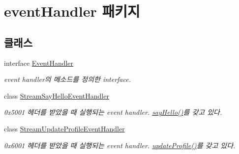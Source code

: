 \hypertarget{namespaceevent_handler}{\section{event\+Handler 패키지}
\label{namespaceevent_handler}
}
\subsection*{클래스}
\begin{DoxyCompactItemize}
\item 
interface \hyperlink{interfaceevent_handler_1_1_event_handler}{Event\+Handler}
\begin{DoxyCompactList}\small\item\em event handler의 메소드를 정의한 interface. \end{DoxyCompactList}\item 
class \hyperlink{classevent_handler_1_1_stream_say_hello_event_handler}{Stream\+Say\+Hello\+Event\+Handler}
\begin{DoxyCompactList}\small\item\em 0x5001 헤더를 받았을 때 실행되는 event handler. \hyperlink{classevent_handler_1_1_stream_say_hello_event_handler_a6af4d6b8a6ed973d984a2eea55e405bc}{say\+Hello()}를 갖고 있다. \end{DoxyCompactList}\item 
class \hyperlink{classevent_handler_1_1_stream_update_profile_event_handler}{Stream\+Update\+Profile\+Event\+Handler}
\begin{DoxyCompactList}\small\item\em 0x6001 헤더를 받았을 때 실행되는 event handler. \hyperlink{classevent_handler_1_1_stream_update_profile_event_handler_a888b80c6db463e195fe9ebefc39c721e}{update\+Profile()}를 갖고 있다. \end{DoxyCompactList}\end{DoxyCompactItemize}
